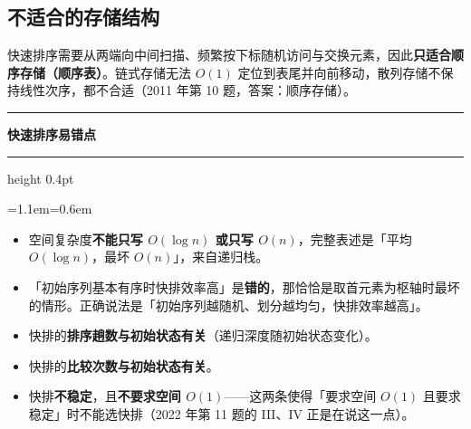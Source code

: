 \documentclass[11pt,openany,UTF8]{ctexbook}
\newcommand{\callouthead}[2]{%
  \par\addvspace{7pt}\noindent
  {\color{#1}\rule[-0.15em]{3pt}{1.05em}}\hspace{0.5em}%
  {\bfseries\color{#1}#2}\par\nobreak\vspace{-0.35em}%
  {\color{rulesep}\hrule height 0.4pt}\nobreak\vspace{0.45em}%
  \begingroup\small\setlength{\parindent}{0pt}%
  \leftskip=1.1em\rightskip=0.6em\noindent\ignorespaces}
\newcommand{\calloutend}{\par\endgroup\addvspace{7pt}}
\newenvironment{callwarn}[1]{\callouthead{warnbar}{#1}}{\calloutend}
\begin{document}
\subsection{不适合的存储结构}

快速排序需要从两端向中间扫描、频繁按下标随机访问与交换元素，因此\textbf{只适合顺序存储（顺序表）}。链式存储无法 $O(1)$ 定位到表尾并向前移动，散列存储不保持线性次序，都不合适（2011 年第 10 题，答案：顺序存储）。

\begin{callwarn}{快速排序易错点}
\begin{itemize}
\item 空间复杂度\textbf{不能只写 $O(\log n)$ 或只写 $O(n)$}，完整表述是「平均 $O(\log n)$，最坏 $O(n)$」，来自递归栈。
\item 「初始序列基本有序时快排效率高」是\textbf{错的}，那恰恰是取首元素为枢轴时最坏的情形。正确说法是「初始序列越随机、划分越均匀，快排效率越高」。
\item 快排的\textbf{排序趟数与初始状态有关}（递归深度随初始状态变化）。
\item 快排的\textbf{比较次数与初始状态有关}。
\item 快排\textbf{不稳定}，且\textbf{不要求空间 $O(1)$}——这两条使得「要求空间 $O(1)$ 且要求稳定」时不能选快排（2022 年第 11 题的 III、IV 正是在说这一点）。
\end{itemize}
\end{callwarn}
\end{document}
